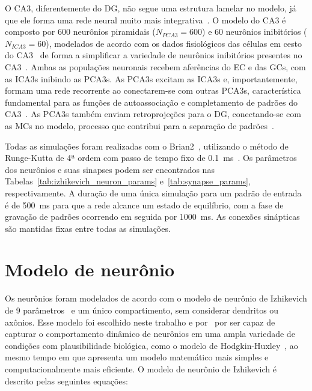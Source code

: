 O CA3, diferentemente do DG, não segue uma estrutura lamelar no modelo, já que ele forma uma rede neural muito mais
integrativa~\cite{pakHippocampal2022, watsonHuman2025}. O modelo do CA3 é composto por 600 neurônios piramidais ($N_{PCA3} = 600$)
e 60 neurônios inibitórios ($N_{ICA3} = 60$), modelados de acordo com os dados fisiológicos das células em cesto do
CA3~\cite{wheelerHippocampomeorg2023} de forma a simplificar a variedade de neurônios inibitórios presentes no
CA3~\cite{kopsickFormation2024}. Ambas as populações neuronais recebem aferências do EC e das GCs, com as ICA3s inibindo as PCA3s.
As PCA3s excitam as ICA3s e, importantemente, formam uma rede recorrente ao conectarem-se com outras PCA3s, característica
fundamental para as funções de autoassociação e completamento de padrões do CA3~\cite{kopsickFormation2024, rollsMechanisms2013}.
As PCA3s também enviam retroprojeções para o DG, conectando-se com as MCs no modelo, processo que contribui para a separação de
padrões~\cite{myersPattern2011}.

Todas as simulações foram realizadas com o Brian2~\cite{stimbergBrian2019a}, utilizando o método de Runge-Kutta de 4ª ordem com
passo de tempo fixo de \SI{0.1}{\milli\second}~\cite{butcherHistory1996}. Os parâmetros dos neurônios e suas sinapses podem ser
encontrados nas Tabelas~\ref{tab:izhikevich_neuron_params} e~\ref{tab:synapse_params}, respectivamente. A duração de uma única
simulação para um padrão de entrada é de \SI{500}{\milli\second} para que a rede alcance um estado de equilíbrio, com a fase de
gravação de padrões ocorrendo em seguida por \SI{1000}{\milli\second}. As conexões sinápticas são mantidas fixas entre todas as
simulações.



\section{Modelo de neurônio}

Os neurônios foram modelados de acordo com o modelo de neurônio de Izhikevich de 9
parâmetros~\cite[cap.~8]{izhikevichDynamical2006} e um único compartimento, sem considerar dendritos ou axônios. Esse modelo foi
escolhido neste trabalho e por~ por ser capaz de capturar o comportamento dinâmico de
neurônios em uma ampla variedade de condições com plausibilidade biológica, como o modelo de
Hodgkin-Huxley~\cite{hodgkinQuantitative1952b}, ao mesmo tempo em que apresenta um modelo matemático mais simples e
computacionalmente mais eficiente. O modelo de neurônio de Izhikevich é descrito pelas seguintes equações:


